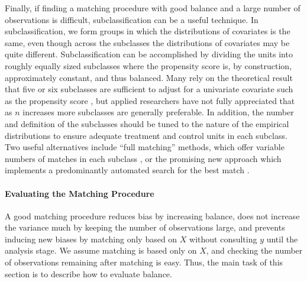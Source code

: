 \documentclass[11pt,titlepage]{article}
\begin{document}
Finally, if finding a matching procedure with good balance and a large
number of observations is difficult, subclassification can be a useful
technique.  In subclassification, we form groups in which the
distributions of covariates is the same, even though across the
subclasses the distributions of covariates may be quite different.
Subclassification can be accomplished by dividing the units into
roughly equally sized subclasses where the propensity score is, by
construction, approximately constant, and thus balanced.  Many rely on
the theoretical result that five or six subclasses are sufficient to
adjust for a univariate covariate such as the propensity score
\citep{Cochran68,RosRub84}, but applied researchers have not fully
appreciated that as $n$ increases more subclasses are generally
preferable.  In addition, the number and definition of the subclasses
should be tuned to the nature of the empirical distributions to ensure
adequate treatment and control units in each subclass.  Two useful
alternatives include ``full matching'' methods, which offer variable
numbers of matches in each subclass \citep{Hansen04}, or the promising
new approach which implements a predominantly automated search for the
best match \citep{DiaSek05}.

\paragraph{Evaluating the Matching Procedure}
%

A good matching procedure reduces bias by increasing balance, does not
increase the variance much by keeping the number of observations
large, and prevents inducing new biases by matching only based on $X$
without consulting $y$ until the analysis stage.  We assume matching
is based only on $X$, and checking the number of observations
remaining after matching is easy.  Thus, the main task of this section
is to describe how to evaluate balance.
\end{document}

